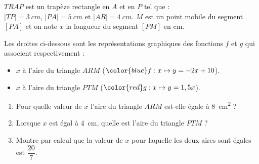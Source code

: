 %
%
    \begin{minipage}{.48\linewidth}
        
    \end{minipage}
    \begin{minipage}{.48\linewidth}
        $TRAP$ est un trapèze rectangle en $A$ et en $P$ tel que :\\
        $|TP| = \SI{3}{cm}$, $|PA| = \SI{5}{cm}$ et $|AR|=\SI{4}{cm}$.\medbreak
        $M$ est un point mobile du segment $[PA]$ et on note $x$ la longueur du segment $[PM]$ en cm.
    \end{minipage}


    Les droites ci-dessous sont les représentations graphiques des fonctions $f$ et $g$ qui associent respectivement :
    \begin{itemize}[label=]
        \item $x$ à l'aire du triangle $ARM$ ($\color{blue}f:x\mapsto y= -2x+10$).
        \item $x$ à l'aire du triangle $PTM$ ($\color{red}g:x\mapsto y=1,5x$).
    \end{itemize}

    

    \begin{enumerate}[resume=mine]
        \item Pour quelle valeur de $x$ l'aire du triangle $ARM$ est-elle égale à \SI{8}{cm^2} ?
        \item Lorsque $x$ est égal à \SI{4}{cm}, quelle est l'aire du triangle $PTM$ ?
        \item Montre par calcul que la valeur de $x$ pour laquelle les deux aires sont égales est $\dfrac{20}{7}$.
    \end{enumerate}
